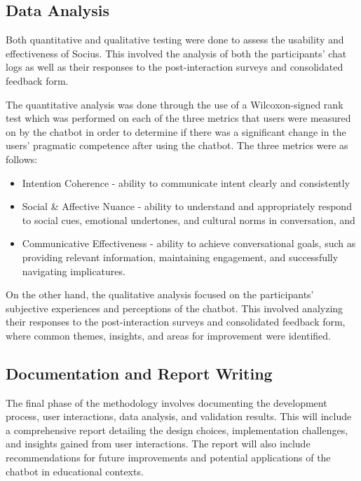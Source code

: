 \subsection{Data Analysis}
\indent Both quantitative and qualitative testing were done to assess the usability and effectiveness of Socius. This involved the analysis of both the participants' chat logs as well as their responses to the
post-interaction surveys and consolidated feedback form.

The quantitative analysis was done through the use of a Wilcoxon-signed rank test which was performed on each of the three metrics that users were measured on by the chatbot in order to determine if there was a 
significant change in the users' pragmatic competence after using the chatbot. The three metrics were as follows: 
\begin{itemize}
\item Intention Coherence - ability to communicate intent clearly and consistently
\item Social \& Affective Nuance - ability to understand and appropriately respond to social cues, emotional undertones, and cultural norms in conversation, and
\item Communicative Effectiveness - ability to achieve conversational goals, such as providing relevant information, maintaining engagement, and successfully navigating implicatures.
\end{itemize}

On the other hand, the qualitative analysis focused on the participants' subjective experiences and perceptions of the chatbot. This involved analyzing their responses to the post-interaction surveys and 
consolidated feedback form, where common themes, insights, and areas for improvement were identified.

\subsection{Documentation and Report Writing}
\indent The final phase of the methodology involves documenting the development process, user interactions, data analysis, and validation results.
This will include a comprehensive report detailing the design choices, implementation challenges, and insights gained from user
interactions. The report will also include recommendations for future improvements and potential applications of the chatbot in
educational contexts.

